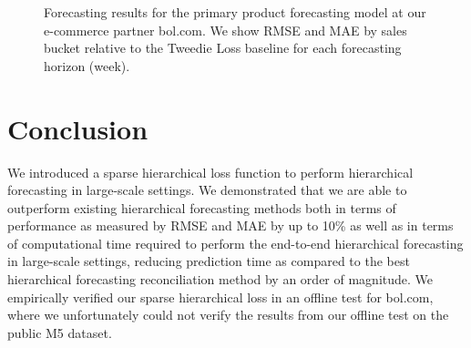\documentclass[preprint, 3p, times, twocolumn]{elsarticle}
\begin{document}
  \begin{figure}[t] 
     \quad
    \caption{Forecasting results for the primary product forecasting model at our e-commerce partner bol.com. We show RMSE and MAE by sales bucket relative to the Tweedie Loss baseline for each forecasting horizon (week).}
    \label{fig:bol_results}
  \end{figure}

\section{Conclusion} \label{sec:conclusion}
  We introduced a sparse hierarchical loss function to perform hierarchical forecasting in large-scale settings. We demonstrated that we are able to outperform existing hierarchical forecasting methods both in terms of performance as measured by RMSE and MAE by up to 10\% as well as in terms of computational time required to perform the end-to-end hierarchical forecasting in large-scale settings, reducing prediction time as compared to the best hierarchical forecasting reconciliation method by an order of magnitude. We empirically verified our sparse hierarchical loss in an offline test for bol.com, where we unfortunately could not verify the results from our offline test on the public M5 dataset. 
\end{document}
